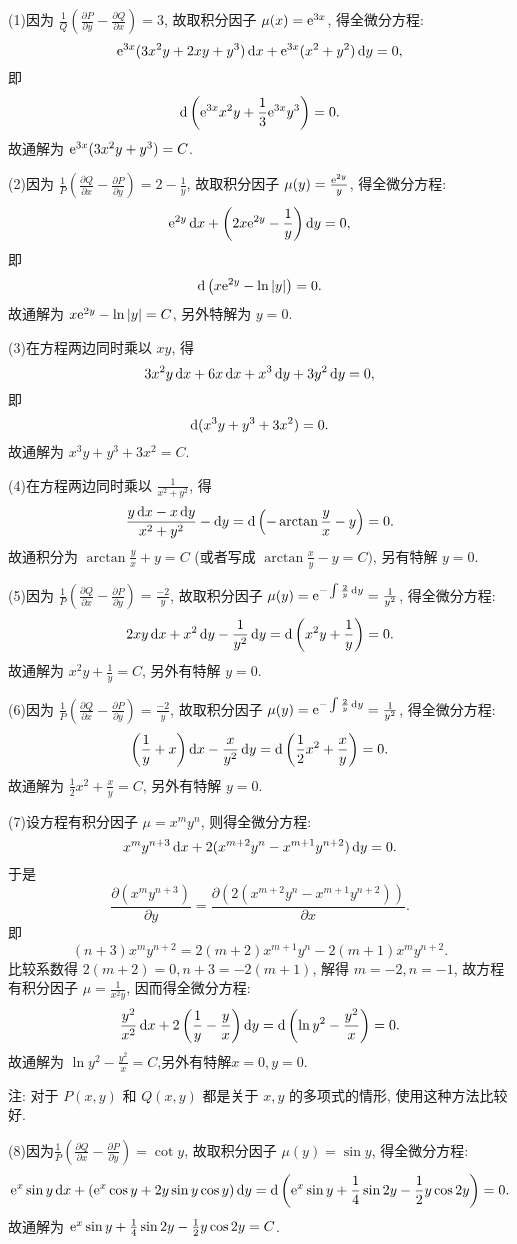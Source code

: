 \begin{solve}
  (1)因为 $\frac{1}{Q}\left(\frac{\partial P}{\partial y}-\frac{\partial Q}{\partial x}\right)=3$,
  故取积分因子 $\mu(x)=\mathrm{e}^{3x}$, 得全微分方程:
  \[\mathrm{e}^{3x}(3x^2y+2xy+y^3)\mathop{}\!\mathrm{d} x+\mathrm{e}^{3x}(x^2+y^2)\mathop{}\!\mathrm{d} y=0,\]
  即
  \[\mathop{}\!\mathrm{d}\left(\mathrm{e}^{3x}x^2y+\frac{1}{3}\mathrm{e}^{3x}y^3\right) = 0.\]
  故通解为 $\mathrm{e}^{3x}(3x^2y+y^3)=C$.

  (2)因为 $\frac{1}{P}\left(\frac{\partial Q}{\partial x}-\frac{\partial P}{\partial y}\right)=2-\frac{1}{y}$, 故取积分因子 $\mu(y)=\frac{\mathrm{e}^{2y}}{y}$, 得全微分方程:
  \[\mathrm{e}^{2y}\mathop{}\!\mathrm{d} x+\left(2x\mathrm{e}^{2y}-\frac{1}{y}\right)\mathop{}\!\mathrm{d} y=0,\]
  即
  \[\mathop{}\!\mathrm{d}\left(x\mathrm{e}^{2y}-\ln|y|\right)=0.\]
  故通解为 $x\mathrm{e}^{2y}-\ln|y|=C$, 另外特解为 $y=0$.

  (3)在方程两边同时乘以 $xy$, 得
  \[3x^2y\mathop{}\!\mathrm{d} x+6x\mathop{}\!\mathrm{d} x+x^3\mathop{}\!\mathrm{d} y+3y^2\mathop{}\!\mathrm{d} y=0,\]
  即
  \[\mathop{}\!\mathrm{d}(x^3y+y^3+3x^2)=0.\]
  故通解为 $x^3y+y^3+3x^2=C$.

  (4)在方程两边同时乘以 $\frac{1}{x^2+y^2}$, 得
  \[\frac{y\mathop{}\!\mathrm{d} x-x\mathop{}\!\mathrm{d} y}{x^2+y^2}-\mathop{}\!\mathrm{d} y=\mathop{}\!\mathrm{d}\left(-\arctan\frac{y}{x}-y\right)=0.\]
  故通积分为 $\arctan\frac{y}{x}+y=C$ (或者写成 $\arctan\frac{x}{y}-y=C)$, 另有特解 $y=0$.

  (5)因为 $\frac{1}{P}\left(\frac{\partial Q}{\partial x}-\frac{\partial P}{\partial y}\right)=\frac{-2}{y}$,
  故取积分因子 $\mu(y)=\mathrm{e}^{-\int\frac{2}{y}\mathop{}\!\mathrm{d} y}=\frac{1}{y^2}$, 得全微分方程:
  \[2xy\mathop{}\!\mathrm{d} x+x^2\mathop{}\!\mathrm{d} y-\frac{1}{y^2}\mathop{}\!\mathrm{d} y=\mathop{}\!\mathrm{d}\left(x^2y+\frac{1}{y}\right)=0.\]
  故通解为 $x^2y+\frac{1}{y}=C$, 另外有特解 $y=0$.

  (6)因为 $\frac{1}{P}\left(\frac{\partial Q}{\partial x}-\frac{\partial P}{\partial y}\right)=\frac{-2}{y}$,
  故取积分因子 $\mu(y)=\mathrm{e}^{-\int\frac{2}{y}\mathop{}\!\mathrm{d} y}=\frac{1}{y^2}$, 得全微分方程:
  \[\left(\frac{1}{y}+x\right)\mathop{}\!\mathrm{d} x-\frac{x}{y^2}\mathop{}\!\mathrm{d} y
    = \mathop{}\!\mathrm{d}\left(\frac{1}{2}x^2+\frac{x}{y}\right)=0.\]
  故通解为 $\frac{1}{2}x^2+\frac{x}{y}=C$, 另外有特解 $y=0$.

  (7)设方程有积分因子 $\mu=x^my^n$, 则得全微分方程:
  \[x^my^{n+3}\mathop{}\!\mathrm{d} x+2(x^{m+2}y^n-x^{m+1}y^{n+2})\mathop{}\!\mathrm{d} y=0.\]
  于是
  \[\frac{\partial\left(x^my^{n+3}\right)}{\partial y}
    = \frac{\partial\left(2\left(x^{m+2}y^n-x^{m+1}y^{n+2}\right)\right)}{\partial x}.\]
  即
  \[(n+3)x^my^{n+2}=2(m+2)x^{m+1}y^n-2(m+1)x^my^{n+2}.\]
  比较系数得 $2(m+2)=0,n+3=-2(m+1)$, 解得 $m=-2,n=-1$,
  故方程有积分因子 $\mu=\frac{1}{x^2y}$, 因而得全微分方程:
  \[\frac{y^2}{x^2}\mathop{}\!\mathrm{d} x+2\left(\frac{1}{y}-\frac{y}{x}\right)\mathop{}\!\mathrm{d} y
    =\mathop{}\!\mathrm{d}\left(\ln y^2-\frac{y^2}{x}\right)=0.\]
  故通解为 $\ln y^2-\frac{y^2}{x}=C$,另外有特解$x=0,y=0$.

  注: 对于 $P(x,y)$ 和 $Q(x,y)$ 都是关于 $x,y$ 的多项式的情形, 使用这种方法比较好.

  (8)因为$\frac{1}{P}\left(\frac{\partial Q}{\partial x}-\frac{\partial P}{\partial y}\right)=\cot y$,
  故取积分因子 $\mu(y)=\sin y$, 得全微分方程:
  \[\mathrm{e}^x\sin y\mathop{}\!\mathrm{d} x+\left(\mathrm{e}^x\cos y+2y\sin y\cos y\right)\mathop{}\!\mathrm{d} y
    = \mathop{}\!\mathrm{d}\left(\mathrm{e}^x\sin y+\frac{1}{4}\sin2y-\frac{1}{2}y\cos2y\right)=0.\]
  故通解为 $\mathrm{e}^x\sin y+\frac{1}{4}\sin2y-\frac{1}{2}y\cos2y=C$.
\end{solve}



